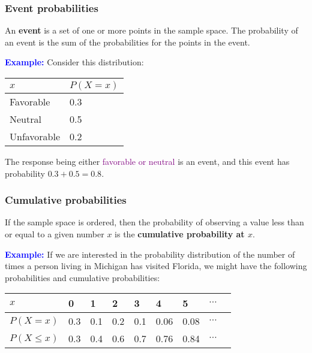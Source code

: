 \begin{frame}
\frametitle{Event probabilities}

An {\bf event} is a set of one or more points in the sample space.
The probability of an event is the sum of the probabilities for the
points in the event.

\textcolor{blue}{\bf Example:} Consider this distribution:

\begin{center}
\begin{tabular}{ll}
{$x$} & {$P(X=x)$}\\\hline 
Favorable & \hspace{0.8cm}0.3 \\
Neutral & \hspace{0.8cm}0.5 \\
Unfavorable & \hspace{0.8cm}0.2 \\\hline
\end{tabular}
\end{center}

The response being either \textcolor{purple}{favorable or neutral} is
an event, and this event has probability $0.3+0.5=0.8$.

\end{frame}

\begin{frame}
\frametitle{Cumulative probabilities}

If the sample space is ordered, then the probability of observing a
value less than or equal to a given number $x$ is the {\bf cumulative
  probability at $x$}.

\textcolor{blue}{\bf Example:} If we are interested in the probability
distribution of the number of times a person living in Michigan has
visited Florida, we might have the following probabilities and
cumulative probabilities:

\begin{center}
\begin{tabular}{lllllllll}
$x$         & 0   & 1 & 2 & 3 & 4 & 5 & $\cdots$\\\hline
$P(X=x)$    & 0.3 & 0.1 & 0.2 & 0.1 & 0.06 & 0.08 & $\cdots$\\
$P(X\le x)$ & 0.3 & 0.4 & 0.6 & 0.7 & 0.76 & 0.84 & $\cdots$\\\hline
\end{tabular}
\end{center}

\end{frame}

